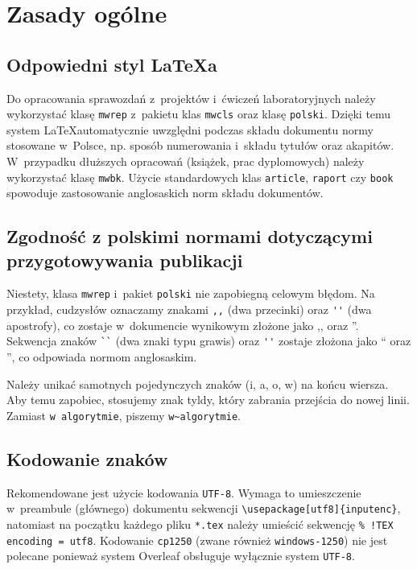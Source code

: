 \newlength\fwidth
\newlength\fheight

\chapter{Zasady ogólne}
\section{Odpowiedni styl \LaTeX a}
Do opracowania sprawozdań z~projektów i~ćwiczeń laboratoryjnych należy wykorzystać klasę \verb+mwrep+ z~pakietu klas \verb+mwcls+ oraz klasę \verb+polski+. Dzięki temu system \LaTeX automatycznie uwzględni podczas składu dokumentu normy stosowane w~Polsce, np. sposób numerowania i~składu tytułów oraz akapitów. W~przypadku dłuższych opracowań (książek, prac dyplomowych) należy wykorzystać klasę \verb+mwbk+. Użycie standardowych klas \verb+article+, \verb+raport+ czy \verb+book+ spowoduje zastosowanie anglosaskich norm składu dokumentów.

\section{Zgodność z polskimi normami dotyczącymi przygotowywania publikacji}
Niestety, klasa \verb+mwrep+ i~pakiet \verb+polski+ nie zapobiegną celowym błędom. Na przykład, cudzysłów oznaczamy znakami  \verb+,,+ (dwa przecinki) oraz  \verb+''+ (dwa apostrofy), co zostaje w~dokumencie wynikowym złożone jako ,, oraz ''. Sekwencja znaków  \verb+``+ (dwa znaki typu grawis) oraz  \verb+''+ zostaje złożona jako `` oraz '', co odpowiada normom anglosaskim.

Należy unikać samotnych pojedynczych znaków (i, a, o, w) na końcu wiersza. Aby temu zapobiec, stosujemy znak tyldy, który zabrania przejścia do nowej linii. Zamiast \verb+w algorytmie+, piszemy \verb+w~algorytmie+.

\section{Kodowanie znaków}
Rekomendowane jest użycie kodowania \texttt{UTF-8}. Wymaga to umieszczenie w~preambule (głównego) dokumentu sekwencji \verb|\usepackage[utf8]{inputenc}|, natomiast na początku każdego pliku \verb|*.tex| należy umieścić sekwencję \verb|% !TEX encoding = utf8|. Kodowanie \texttt{cp1250} (zwane również \texttt{windows-1250}) nie jest polecane ponieważ system Overleaf obsługuje wyłącznie system \texttt{UTF-8}.

